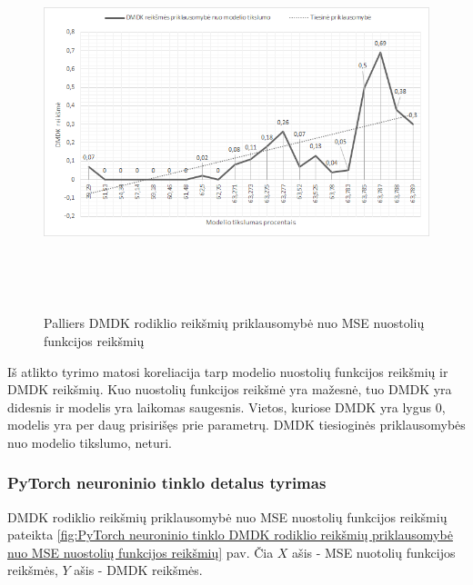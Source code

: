 \documentclass{VUMIFInfBakalaurinis}
\begin{document}
\begin{figure}[h]
  \centering
  \includegraphics[width=14cm,height=11cm,keepaspectratio]{img/pal_tyr_2.png}
  \caption{Palliers DMDK rodiklio reikšmių priklausomybė nuo MSE nuostolių funkcijos reikšmių}
  \label{fig:Palliers DMDK rodiklio reikšmių priklausomybė nuo MSE nuostolių funkcijos reikšmių}
\end{figure}

\par Iš atlikto tyrimo matosi koreliacija tarp modelio nuostolių funkcijos reikšmių ir DMDK reikšmių. Kuo nuostolių funkcijos reikšmė yra mažesnė, tuo DMDK yra didesnis ir modelis yra laikomas saugesnis. Vietos, kuriose DMDK yra lygus 0, modelis yra per daug prisirišęs prie parametrų. DMDK tiesioginės priklausomybės nuo modelio tikslumo, neturi.

\subsubsection{PyTorch neuroninio tinklo detalus tyrimas}
\par DMDK rodiklio reikšmių priklausomybė nuo MSE nuostolių funkcijos reikšmių pateikta \ref{fig:PyTorch neuroninio tinklo DMDK rodiklio reikšmių priklausomybė nuo MSE nuostolių funkcijos reikšmių} pav. Čia $X$ ašis - MSE nuotolių funkcijos reikšmės, $Y$ ašis - DMDK reikšmės. 
\end{document}
